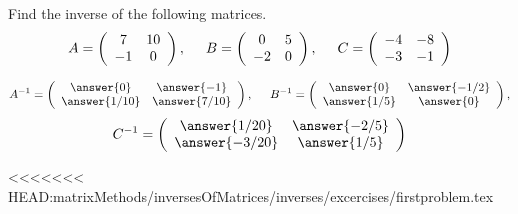 \documentclass{ximera}
\author{Parisa Fatheddin}
\author{Parisa Fatheddin}
\begin{document}
\begin{exercise}
Find the inverse of the following matrices.
\[ A= \left(\begin{array}{cc}
  7 & 10   \\
  -1 &  0
\end{array}\right), \hspace{.5cm} B= \left(\begin{array}{cc}
  0 & 5   \\
  -2 &  0
\end{array}\right), \hspace{.5cm} C= \left(\begin{array}{cc}
  -4 & -8   \\
  -3 &  -1
\end{array}\right)
\]
\begin{prompt}
\[A^{-1}=  \left(\begin{array}{cc}
  \answer{0} & \answer{-1}   \\
  \answer{1/10} & \answer{7/10}   \\
\end{array}\right),\hspace{.5cm} B^{-1}=  \left(\begin{array}{cc}
  \answer{0} & \answer{-1/2}   \\
  \answer{1/5} & \answer{0}   \\
\end{array}\right),
\]
\[ C^{-1}=  \left(\begin{array}{cc}
  \answer{1/20} & \answer{-2/5}   \\
  \answer{-3/20} & \answer{1/5}   \\
\end{array}\right)
\]
\end{prompt}
\end{exercise}












<<<<<<< HEAD:matrixMethods/inversesOfMatrices/inverses/excercises/firstproblem.tex
\end{document}
